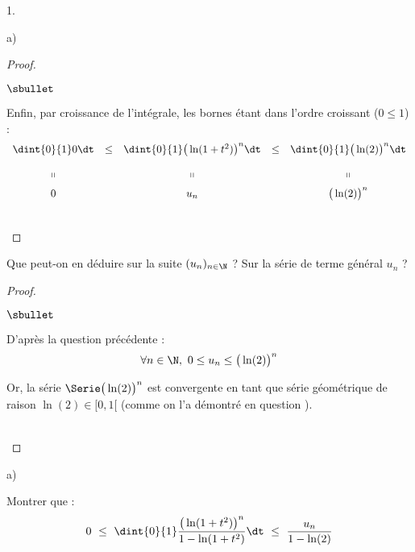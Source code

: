 \documentclass[11pt]{article}%
\begin{document}
\begin{noliste}{1.}
\begin{noliste}{a)}
\begin{proof}
\begin{noliste}{$\sbullet$}


      \item Enfin, par croissance de l'intégrale, les bornes étant
        dans l'ordre croissant ($0 \leq 1$) : 
        \[
        \begin{array}{ccccc}
          \dint{0}{1} 0 \dt & \leq & \dint{0}{1} \big( \ln(1 + t^2)
          \big)^n \dt & \leq & \dint{0}{1} \big( \ln(2) \big)^n \dt 
          \\[.4cm]
          \shortparallel & & \shortparallel & & \shortparallel
          \\[.2cm]
          0 & & u_n & & \big(\ln(2) \big)^n
        \end{array}
        \]
      \end{noliste}
      ~\\[-1cm] 
    \end{proof}

  \item Que peut-on en déduire sur la suite $(u_n)_{n \in \N}$ ? Sur
    la série de terme général $u_n$ ?

    \begin{proof}~%
      \begin{noliste}{$\sbullet$}
      \item D'après la question précédente : 
        \[
        \forall n \in \N, \ 0 \leq u_n \leq \big(\ln(2) \big)^n
        \]

      \item Or, la série $\Serie \big(\ln(2) \big)^n$ est convergente
        en tant que série géométrique de raison $\ln(2) \in [0, 1[$
        (comme on l'a démontré en question ).
      \end{noliste}
      ~\\[-1.4cm]
    \end{proof}
  \end{noliste}  

\item
  \begin{noliste}{a)}
    \setlength{\itemsep}{2mm}
  \item Montrer que : 
    \[
    0 \ \leq \ \dint{0}{1} \dfrac{\big( \ln(1 + t^2) \big)^n}{1 -
      \ln(1 + t^2)} \dt \ \leq \ \dfrac{u_n}{1 - \ln(2)}
    \]


\end{noliste}
\end{noliste}
\end{document}
